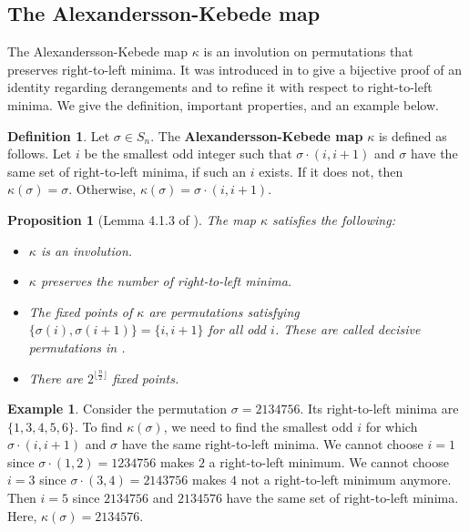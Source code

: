 \documentclass{amsart}
\newtheorem{prop}[thm]{Proposition}
\theoremstyle{definition}
\newtheorem{definition}[thm]{Definition}
\newtheorem{example}[thm]{Example}
\begin{document}
\subsection{The Alexandersson-Kebede map}\label{subsec:ak}
The Alexandersson-Kebede map $\kappa$ is an involution on permutations that preserves right-to-left minima. It was introduced in \cite{AlexanderssonKebede} to give a bijective proof of an identity regarding derangements and to refine it with respect to right-to-left minima. We give the definition, important properties, and an example below.

\begin{definition}
  Let $\sigma\in S_n$. The \textbf{Alexandersson-Kebede map} $\kappa$ is defined as follows. Let $i$ be the smallest odd integer such that $\sigma\cdot(i, i+1)$ and $\sigma$ have the same set of right-to-left minima, if such an $i$ exists. If it does not, then $\kappa(\sigma) = \sigma$. Otherwise, $\kappa(\sigma) = \sigma\cdot (i, i+1)$.
\end{definition}


\begin{prop}[Lemma 4.1.3 of \cite{AlexanderssonKebede}]\label{prop:AK_properties}
  The map $\kappa$ satisfies the following:
  \begin{itemize}
    \item $\kappa$ is an involution.
    \item $\kappa$ preserves the number of right-to-left minima.
    \item The fixed points of $\kappa$ are permutations satisfying $\{\sigma(i), \sigma(i+1)\} =\{i, i+1\}$ for all odd $i$. These are called \textit{decisive permutations} in \cite{AlexanderssonKebede}.
    \item There are  $2^{\lfloor \frac{n}{2}\rfloor}$ fixed points.
  \end{itemize}
\end{prop}

\begin{example}
  Consider the permutation $\sigma = 2134756$. Its right-to-left minima are $\{1,3,4,5,6\}$. To find $\kappa(\sigma)$, we need to find the smallest odd $i$ for which $\sigma\cdot(i, i+1)$ and $\sigma$ have the same right-to-left minima. We cannot choose $i=1$ since $\sigma\cdot(1,2) = 1234756$ makes $2$ a right-to-left minimum. We cannot choose $i=3$ since  $\sigma\cdot(3,4) = 2143756$ makes $4$ not a right-to-left minimum anymore. Then $i=5$ since $2134756$ and $2134576$ have the same set of right-to-left minima. Here, $\kappa(\sigma) = 2134576$.
\end{example}
\end{document}
